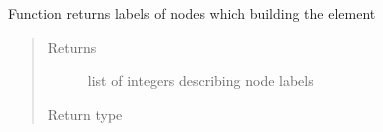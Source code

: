 \documentclass[letterpaper,10pt,english]{sphinxmanual}
\begin{document}
\begin{fulllineitems}
\begin{fulllineitems}
\begin{quote}
\begin{description}
\end{description}\end{quote}

\end{fulllineitems}


\begin{fulllineitems}
\label{\detokenize{pyCofea/api:cofea.Element.getNodeLabels}}
Function returns labels of nodes which building the element
\begin{quote}\begin{description}
\item[{Returns}] \leavevmode
list of integers describing node labels

\item[{Return type}] \leavevmode
{}

\end{description}\end{quote}

\end{fulllineitems}


\end{fulllineitems}

\end{document}

